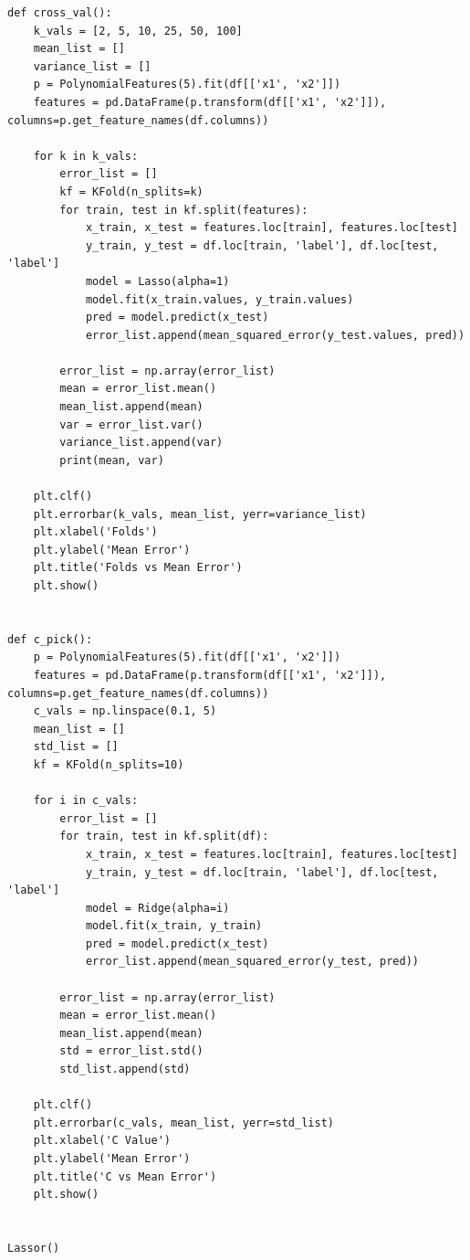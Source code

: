 \documentclass[11pt]{article} %
\begin{document}
\begin{verbatim}
def cross_val():
    k_vals = [2, 5, 10, 25, 50, 100]
    mean_list = []
    variance_list = []
    p = PolynomialFeatures(5).fit(df[['x1', 'x2']])
    features = pd.DataFrame(p.transform(df[['x1', 'x2']]), columns=p.get_feature_names(df.columns))
    
    for k in k_vals:
        error_list = []
        kf = KFold(n_splits=k)
        for train, test in kf.split(features):
            x_train, x_test = features.loc[train], features.loc[test]
            y_train, y_test = df.loc[train, 'label'], df.loc[test, 'label']
            model = Lasso(alpha=1)
            model.fit(x_train.values, y_train.values)
            pred = model.predict(x_test)
            error_list.append(mean_squared_error(y_test.values, pred))
       
        error_list = np.array(error_list)
        mean = error_list.mean()
        mean_list.append(mean)
        var = error_list.var()
        variance_list.append(var)
        print(mean, var)
   
    plt.clf()
    plt.errorbar(k_vals, mean_list, yerr=variance_list)
    plt.xlabel('Folds')
    plt.ylabel('Mean Error')
    plt.title('Folds vs Mean Error')
    plt.show()


def c_pick():
    p = PolynomialFeatures(5).fit(df[['x1', 'x2']])
    features = pd.DataFrame(p.transform(df[['x1', 'x2']]), columns=p.get_feature_names(df.columns))
    c_vals = np.linspace(0.1, 5)
    mean_list = []
    std_list = []
    kf = KFold(n_splits=10)
   
    for i in c_vals:
        error_list = []
        for train, test in kf.split(df):
            x_train, x_test = features.loc[train], features.loc[test]
            y_train, y_test = df.loc[train, 'label'], df.loc[test, 'label']
            model = Ridge(alpha=i)
            model.fit(x_train, y_train)
            pred = model.predict(x_test)
            error_list.append(mean_squared_error(y_test, pred))
     
        error_list = np.array(error_list)
        mean = error_list.mean()
        mean_list.append(mean)
        std = error_list.std()
        std_list.append(std)
  
    plt.clf()
    plt.errorbar(c_vals, mean_list, yerr=std_list)
    plt.xlabel('C Value')
    plt.ylabel('Mean Error')
    plt.title('C vs Mean Error')
    plt.show()


Lassor()

\end{verbatim}
\end{document}
